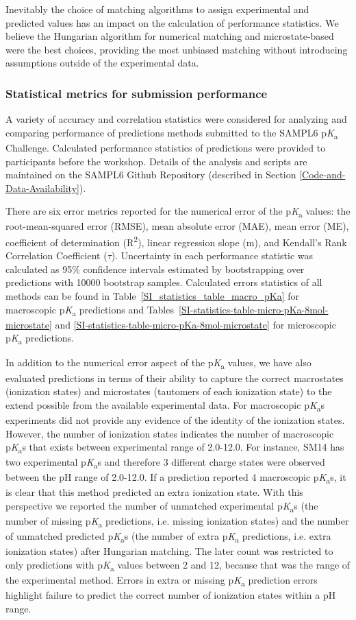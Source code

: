 \documentclass[9pt,lineno,final]{elife}
\newcommand{\pKa}{p\textit{K}\textsubscript{a}}
\begin{document}
Inevitably the choice of matching algorithms to assign experimental and predicted values has an impact on the calculation of performance statistics. We believe the Hungarian algorithm for numerical matching and microstate-based were the best choices, providing the most unbiased matching without introducing assumptions outside of the experimental data.

\subsubsection{Statistical metrics for submission performance}

A variety of accuracy and correlation statistics were considered for analyzing and comparing performance of predictions methods submitted to the SAMPL6 \pKa{} Challenge. 
Calculated performance statistics of predictions were provided to participants before the workshop. 
Details of the analysis and scripts are maintained on the SAMPL6 Github Repository (described in Section \ref{Code-and-Data-Availability}).

There are six error metrics reported for the numerical error of the \pKa{} values: the root-mean-squared error (RMSE), mean absolute error (MAE), mean error (ME), coefficient of determination (R\textsuperscript{2}), linear regression slope (m), and Kendall’s Rank Correlation Coefficient ($\tau$).
Uncertainty in each performance statistic was calculated as 95\% confidence intervals estimated by bootstrapping over predictions with 10000 bootstrap samples. 
Calculated errors statistics of all methods can be found in Table~\ref{SI_statistics_table_macro_pKa} for macroscopic \pKa{} predictions and Tables~\ref{SI-statistics-table-micro-pKa-8mol-microstate} and \ref{SI-statistics-table-micro-pKa-8mol-microstate} for microscopic \pKa{} predictions. 

In addition to the numerical error aspect of the \pKa{} values, we have also evaluated predictions in terms of their ability to capture the correct macrostates (ionization states) and microstates (tautomers of each ionization state) to the extend possible from the available experimental data. 
For macroscopic \pKa{}s experiments did not provide any evidence of the identity of the ionization states. 
However, the number of ionization states indicates the number of macroscopic \pKa{}s that exists between experimental range of 2.0-12.0. 
For instance, SM14 has two experimental \pKa{}s and therefore 3 different charge states were observed between the pH range of 2.0-12.0. 
If a prediction reported 4 macroscopic \pKa{}s, it is clear that this method predicted an extra ionization state. 
With this perspective we reported the number of unmatched experimental \pKa{}s (the number of missing \pKa{} predictions, i.e. missing ionization states) and the number of unmatched predicted \pKa{}s (the number of extra \pKa{} predictions, i.e. extra ionization states) after Hungarian matching. 
The later count was restricted to only predictions with \pKa{} values between 2 and 12, because that was the range of the experimental method. 
Errors in extra or missing \pKa{} prediction errors highlight failure to predict the correct number of ionization states within a pH range.
\end{document}
